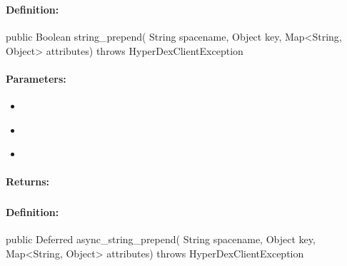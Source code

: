 \subsubsection{}
\label{api:java:string_prepend}


\paragraph{Definition:}
\begin{javacode}
public Boolean string_prepend(
        String spacename,
        Object key,
        Map<String, Object> attributes) throws HyperDexClientException
\end{javacode}

\paragraph{Parameters:}
\begin{itemize}[noitemsep]
\item {}\\

\item {}\\

\item {}\\

\end{itemize}

\paragraph{Returns:}


\pagebreak
\subsubsection{}
\label{api:java:async_string_prepend}


\paragraph{Definition:}
\begin{javacode}
public Deferred async_string_prepend(
        String spacename,
        Object key,
        Map<String, Object> attributes) throws HyperDexClientException
\end{javacode}

